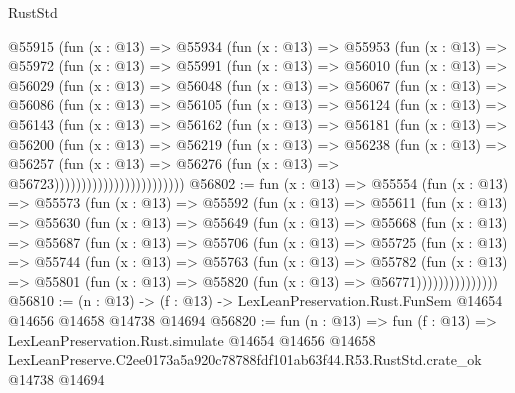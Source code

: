 \begin{lexlean}{RustStd}
\begin{coremodule}
          @55915
            (fun (x : @13) =>
            @55934
              (fun (x : @13) =>
              @55953
                (fun (x : @13) =>
                @55972
                  (fun (x : @13) =>
                  @55991
                    (fun (x : @13) =>
                    @56010
                      (fun (x : @13) =>
                      @56029
                        (fun (x : @13) =>
                        @56048
                          (fun (x : @13) =>
                          @56067
                            (fun (x : @13) =>
                            @56086
                              (fun (x : @13) =>
                              @56105
                                (fun (x : @13) =>
                                @56124
                                  (fun (x : @13) =>
                                  @56143
                                    (fun (x : @13) =>
                                    @56162
                                      (fun (x : @13) =>
                                      @56181
                                        (fun (x : @13) =>
                                        @56200
                                          (fun (x : @13) =>
                                          @56219
                                            (fun (x : @13) =>
                                            @56238
                                              (fun (x : @13) =>
                                              @56257
                                                (fun (x : @13) =>
                                                @56276
                                                  (fun (x : @13) => @56723))))))))))))))))))))))))
@56802 := fun (x : @13) =>
  @55554
    (fun (x : @13) =>
    @55573
      (fun (x : @13) =>
      @55592
        (fun (x : @13) =>
        @55611
          (fun (x : @13) =>
          @55630
            (fun (x : @13) =>
            @55649
              (fun (x : @13) =>
              @55668
                (fun (x : @13) =>
                @55687
                  (fun (x : @13) =>
                  @55706
                    (fun (x : @13) =>
                    @55725
                      (fun (x : @13) =>
                      @55744
                        (fun (x : @13) =>
                        @55763
                          (fun (x : @13) =>
                          @55782
                            (fun (x : @13) =>
                            @55801 (fun (x : @13) => @55820 (fun (x : @13) => @56771)))))))))))))))
@56810 := (n : @13) ->
  (f : @13) -> LexLeanPreservation.Rust.FunSem @14654 @14656 @14658 @14738 @14694
@56820 := fun (n : @13) =>
  fun (f : @13) =>
  LexLeanPreservation.Rust.simulate
    @14654
    @14656
    @14658
    LexLeanPreserve.C2ee0173a5a920c78788fdf101ab63f44.R53.RustStd.crate_ok
    @14738
    @14694
\end{coremodule}
\end{lexlean}
